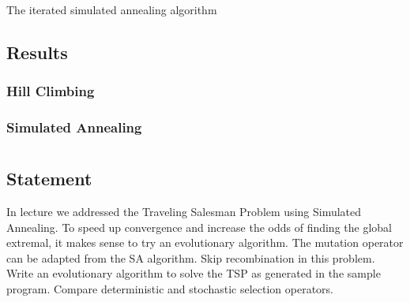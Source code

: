 \documentclass{article}
\begin{document}
\begin{algorithm}
    \begin{algorithmic}
            \State{}
        \EndFunction{}
    \end{algorithmic}
    \caption{The iterated simulated annealing algorithm}\label{alg:iterated-simulated-annealing}
\end{algorithm}


\subsection{Results}

\subsubsection{Hill Climbing}

\subsubsection{Simulated Annealing}

\section{}\label{prob:2}
\subsection{Statement}
In lecture we addressed the Traveling Salesman Problem using Simulated Annealing. To speed up
convergence and increase the odds of finding the global extremal, it makes sense to try an
evolutionary algorithm. The mutation operator can be adapted from the SA algorithm. Skip
recombination in this problem. Write an evolutionary algorithm to solve the TSP as generated in the
sample program. Compare deterministic and stochastic selection operators.
\end{document}
